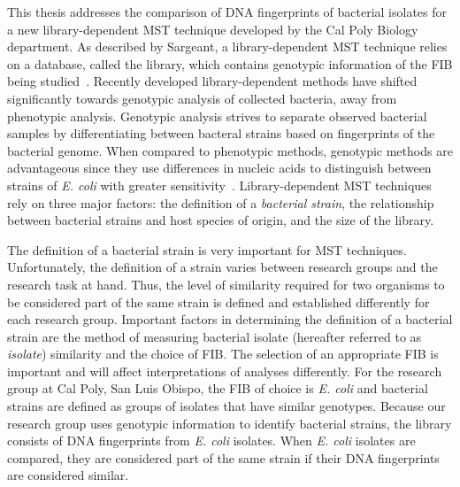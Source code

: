 \documentclass[12pt]{ucthesis}
\begin{document}
   This thesis addresses the comparison of DNA fingerprints of bacterial
   isolates for a new library-dependent MST technique developed by the Cal
   Poly Biology department. As described by Sargeant, a library-dependent MST
   technique relies on a database, called the library, which contains genotypic
   information of the FIB being studied~\cite{Sargeant:ReviewMST}. Recently
   developed library-dependent methods have shifted significantly towards
   genotypic analysis of collected bacteria, away from phenotypic analysis.
   Genotypic analysis strives to separate observed bacterial samples by
   differentiating between bacteral strains based on fingerprints of the
   bacterial genome. When compared to phenotypic methods, genotypic methods are
   advantageous since they use differences in nucleic acids to distinguish
   between strains of \textit{E. coli} with greater
   sensitivity~\cite{Anderson:Diversity, Gordon:StrainTyping, Ochman:Enzyme,
   Scott:CurrentMST, Simpson:StateOf}. Library-dependent MST techniques rely
   on three major factors: the definition of a \textit{bacterial strain}, the
   relationship between bacterial strains and host species of origin, and the
   size of the library.

   The definition of a bacterial strain is very important for MST
   techniques. Unfortunately, the definition of a strain varies between
   research groups and the research task at hand. Thus, the level of similarity
   required for two organisms to be considered part of the same strain is
   defined and established differently for each research group. Important
   factors in determining the definition of a bacterial strain are the method
   of measuring bacterial isolate (hereafter referred to as \textit{isolate})
   similarity and the choice of FIB. The selection of an appropriate FIB is
   important and will affect interpretations of analyses differently. For the
   research group at Cal Poly, San Luis Obispo, the FIB of choice is \textit{E.
   coli} and bacterial strains are defined as groups of isolates that have
   similar genotypes. Because our research group uses genotypic information to
   identify bacterial strains, the library consists of DNA fingerprints from
   \textit{E. coli} isolates. When \textit{E. coli} isolates are compared, they
   are considered part of the same strain if their DNA fingerprints are
   considered similar.
   
\end{document}
